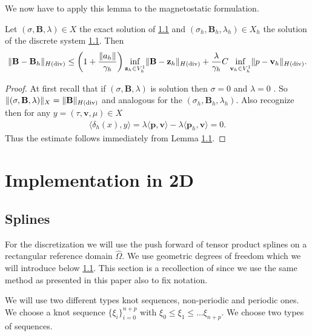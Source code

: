 \documentclass[../master_thesis.tex]{subfiles}
\begin{document}
We now have to apply this lemma to the magnetostatic formulation.

\begin{theorem}
    Let $(\sigma,\mathbf{B},\lambda) \in X$ the exact solution of \ref{} and 
    $(\sigma_h,\mathbf{B}_h,\lambda_h) \in X_h$ the solution of the discrete 
    system \ref{}. Then 
    \begin{align*}
        \lVert \mathbf{B} - \mathbf{B}_h \rVert _{H(\operatorname{div})} 
        \leq \left( 1 + \frac{\lVert a_h \rVert}{\gamma_h} \right)
            \inf_{\mathbf{z}_h \in V_h^1} \lVert \mathbf{B} - \mathbf{z}_h \rVert _{H(\operatorname{div})} 
            + \frac{\lambda}{\gamma_h} C \inf_{\mathbf{v}_h \in V_h^1} \lVert p - \mathbf{v}_h \rVert _{H(\operatorname{div})}.
    \end{align*}
\end{theorem}
\begin{proof}
    At first recall that if $(\sigma,\mathbf{B},\lambda)$ is solution then 
    $\sigma = 0$ and $\lambda = 0$ . 
    So $\lVert (\sigma,\mathbf{B},\lambda) \rVert _X = \lVert \mathbf{B} \rVert _{H(\operatorname{div})}$
    and analogous for the $(\sigma_h,\mathbf{B}_h,\lambda_h)$.
    Also recognize then for any $y = (\tau,\mathbf{v}, \mu) \in X$
    \begin{align*}
        \langle \delta_h(x), y \rangle = \lambda \langle \mathbf{p}, \mathbf{v} \rangle 
        - \lambda \langle \mathbf{p}_h, \mathbf{v} \rangle = 0.
    \end{align*}
    Thus the estimate follows immediately from Lemma \ref{}.
\end{proof}

\section{Implementation in 2D}

\subsection{Splines}

For the discretization we will use the push forward of tensor product splines 
on a rectangular reference domain $\hat{\Omega}$. We use geometric degrees of freedom
which we will introduce below \ref{}. This section is a recollection 
 of \cite[Sec. 4.2]{broken FEEC framework on mapped multipatch} 
since we use the same method as presented in this paper also to fix notation. 

We will use two different types knot sequences, non-periodic and periodic ones. 
We choose a knot sequence $\{ \xi_i \}_{i=0}^{n+p}$ with 
$\xi_0 \leq \xi_1 \leq ... \xi_{n+p}$. We choose two types of sequences.
\end{document}
